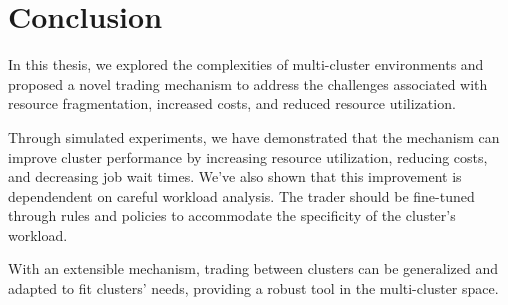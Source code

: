 
\chapter{Conclusion}

In this thesis, we explored the complexities of multi-cluster environments and
proposed a novel trading mechanism to address the challenges associated with
resource fragmentation, increased costs, and reduced resource utilization. 

Through simulated experiments, we have demonstrated that the mechanism can
improve cluster performance by increasing resource utilization, reducing costs,
and decreasing job wait times. We've also shown that this improvement is
dependendent on careful workload analysis. The trader should be fine-tuned
through rules and policies to accommodate the specificity of the cluster's
workload. 

With an extensible mechanism, trading between clusters can be generalized and
adapted to fit clusters' needs, providing a robust tool in the multi-cluster
space. 
